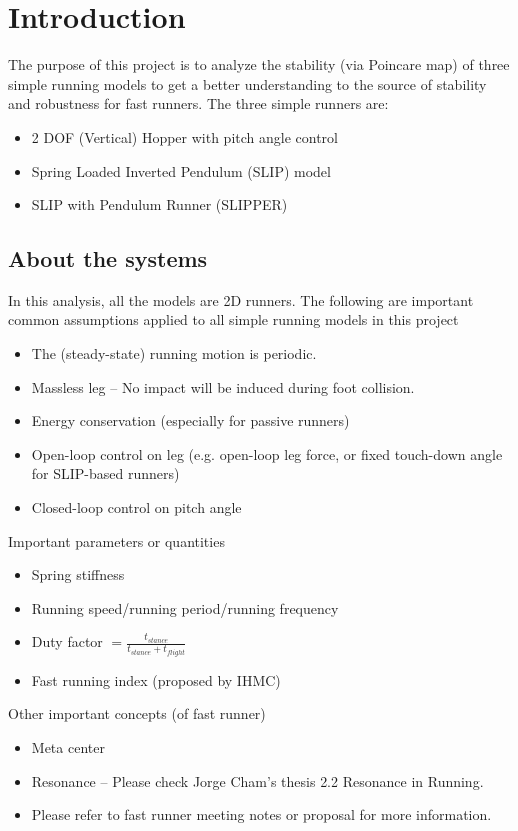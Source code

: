 \section{Introduction}
The purpose of this project is to analyze the stability (via Poincare map) of three simple running models to get a better understanding to the source of stability and robustness for fast runners. The three simple runners are:
	\begin{itemize}
	\item 2 DOF (Vertical) Hopper with pitch angle control
	\item Spring Loaded Inverted Pendulum (SLIP) model
	\item SLIP with Pendulum Runner (SLIPPER)
	\end{itemize}


\subsection{About the systems}
In this analysis, all the models are 2D runners.
The following are important common assumptions applied to all simple running models in this project
	\begin{itemize}
	\item The (steady-state) running motion is periodic.
	\item Massless leg -- No impact will be induced during foot collision.
	\item Energy conservation (especially for passive runners)
	\item Open-loop control on leg (e.g. open-loop leg force, or fixed touch-down angle for SLIP-based runners)
	\item Closed-loop control on pitch angle
	\end{itemize}
 
 \noindent Important parameters or quantities

\begin{itemize}
	\item Spring stiffness
	\item Running speed/running period/running frequency
	\item Duty factor $= \frac{t_{stance}}{t_{stance}+t_{flight}}$	
	\item Fast running index (proposed by IHMC)
\end{itemize}

 \noindent Other important concepts (of fast runner)
\begin{itemize}
	\item Meta center
	\item Resonance -- Please check Jorge Cham's thesis \cite{Cham2002} 2.2 Resonance in Running.
	\item Please refer to fast runner meeting notes or proposal for more information.
\end{itemize}

